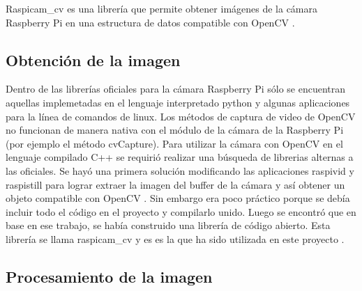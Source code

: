 Raspicam\_cv es una librería que permite obtener im\'agenes de la cámara Raspberry Pi en una estructura de datos compatible con OpenCV \cite{emilV}.

\subsection{Obtenci\'on de la imagen}\label{extraerImagen}

Dentro de las librerías oficiales para la cámara Raspberry Pi s\'olo se encuentran aquellas implemetadas en el lenguaje interpretado python y algunas aplicaciones para la línea de comandos de linux. Los métodos de captura de video de OpenCV no funcionan de manera nativa con el m\'odulo de la cámara de la Raspberry Pi (por ejemplo el método cvCapture). Para utilizar la cámara con OpenCV en el lenguaje compilado \gls{C++} se requirió realizar una búsqueda de librerias alternas a las oficiales. Se hayó una primera solución modificando las aplicaciones raspivid y raspistill para lograr extraer la imagen del buffer de la cámara y así obtener un objeto compatible con OpenCV \cite{pierreR}. Sin embargo era poco práctico porque se debía incluir todo el código en el proyecto y compilarlo unido. Luego se encontró que en base en ese trabajo, se había construido una librería de código abierto. Esta librería se llama raspicam\_cv y es es la que ha sido utilizada en este proyecto \cite{emilV}.


\subsection{Procesamiento de la imagen}\label{procesarImagen}

